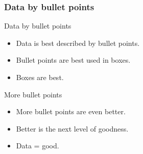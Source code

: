 
\begin{frame}
\frametitle{Data by bullet points}
\begin{center}

\begin{block}{Data by bullet points}
\begin{itemize}
	\item Data is best described by bullet points.
	\item Bullet points are best used in boxes.
	\item Boxes are best.
\end{itemize}
\end{block}

\begin{exampleblock}{More bullet points}
\begin{itemize}
	\item More bullet points are even better.
	\item Better is the next level of goodness.
	\item Data = good.
\end{itemize}
\end{exampleblock}

\end{center}
\end{frame}

